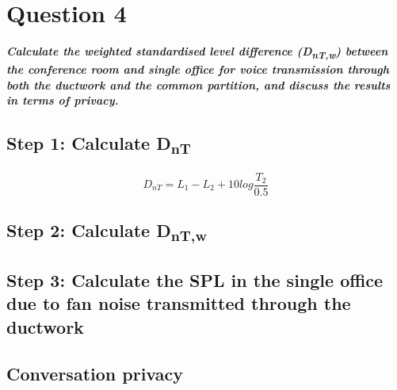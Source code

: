 \section{Question 4}

\textbf{\textit{Calculate the weighted standardised level difference (D\textsubscript{nT,w}) between the conference room and single office for voice transmission through both the ductwork and the common partition, and discuss the results in terms of privacy.}}


\subsection{Step 1: Calculate D\textsubscript{nT}}


	\begin{equation}\label{eq:DnT}
		D_{nT} = L_1 - L_2 + 10 log \frac{T_2}{0.5}
	\end{equation}






\subsection{Step 2: Calculate D\textsubscript{nT,w}}



\subsection{Step 3: Calculate the SPL in the single office due to fan noise transmitted through the ductwork}



\subsection{Conversation privacy}

